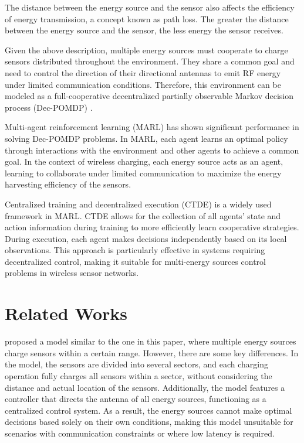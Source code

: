 \documentclass{article}
\begin{document}
The distance between the energy source and the sensor also affects the efficiency of energy transmission, a concept known as path loss. The greater the distance between the energy source and the sensor, the less energy the sensor receives.

Given the above description, multiple energy sources must cooperate to charge sensors distributed throughout the environment. They share a common goal and need to control the direction of their directional antennas to emit RF energy under limited communication conditions. Therefore, this environment can be modeled as a full-cooperative decentralized partially observable Markov decision process (Dec-POMDP) \cite{oliehoek2016concise}.

Multi-agent reinforcement learning (MARL) has shown significant performance in solving Dec-POMDP problems. In MARL, each agent learns an optimal policy through interactions with the environment and other agents to achieve a common goal. In the context of wireless charging, each energy source acts as an agent, learning to collaborate under limited communication to maximize the energy harvesting efficiency of the sensors.

Centralized training and decentralized execution (CTDE) is a widely used framework in MARL. CTDE allows for the collection of all agents' state and action information during training to more efficiently learn cooperative strategies. During execution, each agent makes decisions independently based on its local observations. This approach is particularly effective in systems requiring decentralized control, making it suitable for multi-energy sources control problems in wireless sensor networks.

\section{Related Works}
\cite{ko2018phase} proposed a model similar to the one in this paper, where multiple energy sources charge sensors within a certain range. However, there are some key differences. In the model, the sensors are divided into several sectors, and each charging operation fully charges all sensors within a sector, without considering the distance and actual location of the sensors. Additionally, the model features a controller that directs the antenna of all energy sources, functioning as a centralized control system. As a result, the energy sources cannot make optimal decisions based solely on their own conditions, making this model unsuitable for scenarios with communication constraints or where low latency is required.
\end{document}
